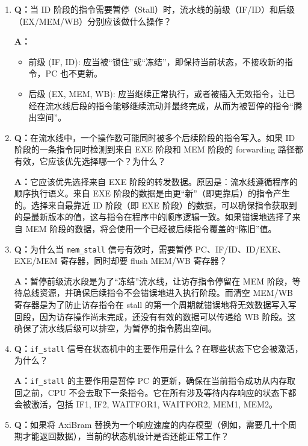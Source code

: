 \begin{enumerate}
    \item \textbf{Q：}当 ID 阶段的指令需要暂停（Stall）时，流水线的前级（IF/ID）和后级（EX/MEM/WB）分别应该做什么操作？

    \textbf{A：}
    \begin{itemize}
        \item 前级 (IF, ID): 应当被“锁住”或“冻结”，即保持当前状态，不接收新的指令，PC 也不更新。
        \item 后级 (EX, MEM, WB): 应当继续正常执行，或者被插入无效指令，让已经在流水线后段的指令能够继续流动并最终完成，从而为被暂停的指令“腾出空间”。
    \end{itemize}

    \item \textbf{Q：}在流水线中，一个操作数可能同时被多个后续阶段的指令写入。如果 ID 阶段的一条指令同时检测到来自 EXE 阶段和 MEM 阶段的 forwarding 路径都有效，它应该优先选择哪一个？为什么？

    \textbf{A：}它应该优先选择来自 EXE 阶段的转发数据。原因是：流水线遵循程序的顺序执行语义。来自 EXE 阶段的数据是由更“新”（即更靠后）的指令产生的。选择来自最靠近 ID 阶段（即 EXE 阶段）的数据，可以确保指令获取到的是最新版本的值，这与指令在程序中的顺序逻辑一致。如果错误地选择了来自 MEM 阶段的数据，将会使用一个已经被后续指令覆盖的“陈旧”值。

    \item \textbf{Q：}为什么当 \texttt{mem\_stall} 信号有效时，需要暂停 PC、IF/ID、ID/EXE、EXE/MEM 寄存器，同时却要 flush MEM/WB 寄存器？

    \textbf{A：}暂停前级流水段是为了“冻结”流水线，让访存指令停留在 MEM 阶段，等待总线资源，并确保后续指令不会错误地进入执行阶段。而清空 MEM/WB 寄存器是为了防止访存指令在 stall 的第一个周期就错误地将无效数据写入写回段，因为访存操作尚未完成，还没有有效的数据可以传递给 WB 阶段。这确保了流水线后级可以排空，为暂停的指令腾出空间。

    \item \textbf{Q：}\texttt{if\_stall} 信号在状态机中的主要作用是什么？在哪些状态下它会被激活，为什么？

    \textbf{A：}\texttt{if\_stall} 的主要作用是暂停 PC 的更新，确保在当前指令成功从内存取回之前，CPU 不会去取下一条指令。它在所有涉及等待内存响应的状态下都会被激活，包括 IF1, IF2, WAITFOR1, WAITFOR2, MEM1, MEM2。

    \item \textbf{Q：}如果将 AxiBram 替换为一个响应速度的内存模型（例如，需要几十个周期才能返回数据），当前的状态机设计是否还能正常工作？


\end{enumerate}
